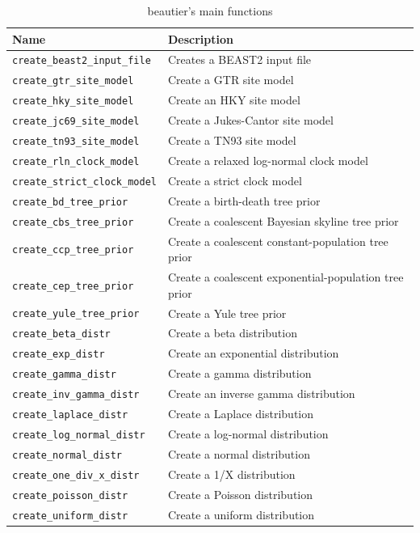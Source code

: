 \documentclass{article}
\begin{document}
\begin{table}[]
\centering
\begin{tabular}{ | l | l | }
\hline
\textbf{Name} & \textbf{Description} \\
\hline
\verb;create_beast2_input_file; & Creates a BEAST2 input file \\
\hline
\verb;create_gtr_site_model; & Create a GTR site model \\
\verb;create_hky_site_model; & Create an HKY site model \\
\verb;create_jc69_site_model; & Create a Jukes-Cantor site model \\
\verb;create_tn93_site_model; & Create a TN93 site model \\
\hline
\verb;create_rln_clock_model; & Create a relaxed log-normal clock model \\
\verb;create_strict_clock_model; & Create a strict clock model \\
\hline
\verb;create_bd_tree_prior; & Create a birth-death tree prior \\
\verb;create_cbs_tree_prior; & Create a coalescent Bayesian skyline tree prior \\
\verb;create_ccp_tree_prior; & Create a coalescent constant-population tree prior \\
\verb;create_cep_tree_prior; & Create a coalescent exponential-population tree prior \\
\verb;create_yule_tree_prior; & Create a Yule tree prior \\
\hline
\verb;create_beta_distr; & Create a beta distribution \\
\verb;create_exp_distr; & Create an exponential distribution \\
\verb;create_gamma_distr; & Create a gamma distribution \\
\verb;create_inv_gamma_distr; & Create an inverse gamma distribution \\
\verb;create_laplace_distr; & Create a Laplace distribution \\
\verb;create_log_normal_distr; & Create a log-normal distribution \\
\verb;create_normal_distr; & Create a normal distribution \\
\verb;create_one_div_x_distr; & Create a 1/X distribution \\
\verb;create_poisson_distr; & Create a Poisson distribution \\
\verb;create_uniform_distr; & Create a uniform distribution \\
\hline
\end{tabular}
\caption{beautier's main functions}
\label{tab:functions}
\end{table}
\end{document}

